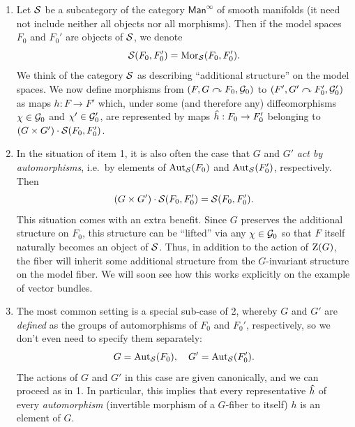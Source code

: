 \begin{enumerate}
    \item Let $\mathcal{S}$ be a subcategory of the category $\mathsf{Man}^\infty$ of smooth manifolds (it need not include neither all objects nor all morphisms). Then if the model spaces $F_0$ and $F_0'$ are objects of $\mathcal{S}$, we denote
    \[\mathcal{S}(F_0,F_0')=\operatorname{Mor}_{\mathcal{S}}(F_0,F_0').\]
    We think of the category $\mathcal{S}$ as describing ``additional structure'' on the model spaces. We now define morphisms from $(F,G\curvearrowright F_0,\mathcal{G}_0)$ to $(F',G'\curvearrowright F_0',\mathcal{G}_0')$ as maps $h:F\to F'$ which, under some (and therefore any) diffeomorphisms $\chi\in\mathcal{G}_0$ and $\chi'\in\mathcal{G}_0'$, are represented by maps $\wh{h}:F_0\to F_0'$ belonging to $(G\times G')\cdot \mathcal{S}(F_0,F_0')$.
    
    \item In the situation of item 1, it is also often the case that $G$ and $G'$ \emph{act by automorphisms}, i.e.\ by elements of $\operatorname{Aut}_{\mathcal{S}}(F_0)$ and $\operatorname{Aut}_{\mathcal{S}}(F_0')$, respectively. Then 
    \[(G\times G')\cdot \mathcal{S}(F_0,F_0')=\mathcal{S}(F_0,F_0').\]
    This situation comes with an extra benefit. Since $G$ preserves the additional structure on $F_0$, this structure can be ``lifted'' via any $\chi\in \mathcal{G}_0$ so that $F$ itself naturally becomes an object of $\mathcal{S}$. Thus, in addition to the action of $\mathrm{Z}(G)$, the fiber will inherit some additional structure from the $G$-invariant structure on the model fiber. We will soon see how this works explicitly on the example of vector bundles.
    \item The most common setting is a special sub-case of 2, whereby $G$ and $G'$ are \emph{defined} as the groups of automorphisms of $F_0$ and $F_0'$, respectively, so we don't even need to specify them separately:
    \[G=\operatorname{Aut}_{\mathcal{S}}(F_0),\quad G'=\operatorname{Aut}_{\mathcal{S}}(F_0').\]
    The actions of $G$ and $G'$ in this case are given canonically, and we can proceed as in 1. In particular, this implies that every representative $\wh{h}$ of every \emph{automorphism} (invertible morphism of a $G$-fiber to itself) $h$ is an element of $G$.
\end{enumerate}

